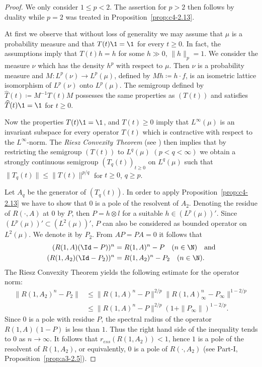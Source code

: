 \begin{proof}
We only consider $1 \leq p < 2$.
The assertion for $p > 2$ then follows by duality while $p = 2$ was treated in Proposition~\ref{prop:c4-2.13}.

At first we observe that without loss of generality we may assume that $\mu$ is a probability measure and that $T(t)\1 = \1$ for every $t \geq 0$.
In fact, the assumptions imply that $T(t)h = h$ for some $h \gg 0$, $\|h\|_{p} = 1$.
We consider the measure $\nu$ which has the density $h^{p}$ with respect to $\mu$.
Then $\nu$ is a probability measure and 
$M \colon L^{p}(\nu) \to L^{p}(\mu)$, defined by $Mh \coloneqq h\cdot f$, is an isometric lattice isomorphism of\/ $L^{p}(\nu)$ onto $L^{p}(\mu)$.
The semigroup defined by $\widehat{T}(t) \coloneqq M^{-1}T(t)M$ possesses the same properties as $(T(t))$ and satisfies $\widehat{T}(t)\1 = \1$ for $t \geq 0$.

Now the properties $T(t)\1 = \1$, and $T(t) \geq 0$ imply that $L^{\infty}(\mu)$ is an invariant subspace for every operator $T(t)$ which is contractive with respect to the $L^{\infty}$-norm.
The \emph{Riesz Convexity Theorem} (see \textcite[VI.10.11]{dunfordschwartz:1958}) then implies that by restricting the semigroup $(T(t))$ to $L^{q}(\mu)$ $(p < q < \infty)$ we obtain a strongly continuous semigroup $(T_{q}(t))_{t \geq 0}$ on $L^{q}(\mu)$ such that $\|T_{q}(t)\| \leq \|T(t)\|^{p/q}$ for $t \geq 0$, $q \geq p$.

Let $A_{q}$ be the generator of\/ $(T_{q}(t))$.
In order to apply Proposition~\ref{prop:c4-2.13} we have to show that $0$ is a pole of the resolvent of\/ $A_{2}$.
Denoting the residue of\/ $R(\cdot,A)$ at $0$ by $P$, then $P = h \otimes l$ for a suitable $h \in (L^{p}(\mu))'$.
Since $(L^{p}(\mu))' \subset (L^{2}(\mu))'$, $P$ can also be considered as bounded operator on $L^{2}(\mu)$.
We denote it by $P_{2}$.
From $AP = PA = 0$ it follows that
\begin{align*}
(R(1,A)(\Id-P))^{n} &= R(1,A)^{n} - P \quad (n \in \N) \quad \text{and} \\
(R(1,A_{2})(\Id-P_{2}))^{n} &= R(1,A_{2})^{n} - P_{2} \quad (n \in \N).
\end{align*}
The Riesz Convexity Theorem yields the following estimate for the operator norm:
\begin{align*}
\|R(1,A_{2})^{n} - P_{2}\| &\leq \|R(1,A)^{n} - P\|^{2/p}\|R(1,A)_{\infty}^{n} - P_{\infty}\|^{1-2/p} \\
&\leq \|R(1,A)^{n} - P\|^{2/p}(1 + \|P_{\infty}\|)^{1-2/p}.
\end{align*}
Since $0$ is a pole with residue $P$, the spectral radius of the operator $R(1,A)(1-P)$ is less than $1$.
Thus the right hand side of the inequality tends to $0$ as $n \to \infty$.
It follows that $r_{ess}(R(1,A_{2})) < 1$, hence $1$ is a pole of the resolvent of\/ $R(1,A_{2})$, or equivalently, $0$ is a pole of\/ $R(\cdot,A_{2})$ (see 
Part-I, Proposition~\ref{prop:a3-2.5}).


\end{proof}
